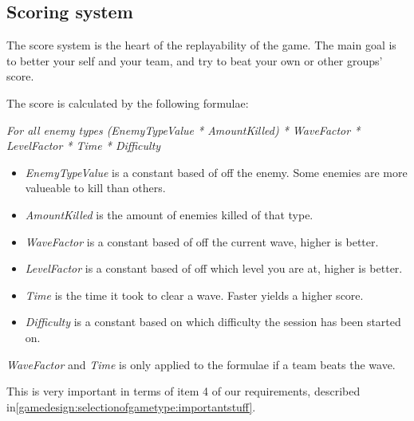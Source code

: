 \subsection{Scoring system}\label{gamedesign:ourgame:scoring}
The score system is the heart of the replayability of the game. The main goal is to better your self and your team, and try to beat your own or other groups' score.

The score is calculated by the following formulae:
\begin{center}
\textit{For all enemy types (EnemyTypeValue * AmountKilled) * WaveFactor * LevelFactor * Time * Difficulty}
\end{center}
\begin{itemize}
\item \textit{EnemyTypeValue} is a constant based of off the enemy. Some enemies are more valueable to kill than others.
\item \textit{AmountKilled} is the amount of enemies killed of that type.
\item \textit{WaveFactor} is a constant based of off the current wave, higher is better.
\item \textit{LevelFactor} is a constant based of off which level you are at, higher is better.
\item \textit{Time} is the time it took to clear a wave. Faster yields a higher score.
\item \textit{Difficulty} is a constant based on which difficulty the session has been started on.
\end{itemize}

\emph{WaveFactor} and \emph{Time} is only applied to the formulae if a team beats the wave.

This is very important in terms of item 4 of our requirements, described in\ref{gamedesign:selectionofgametype:importantstuff}.